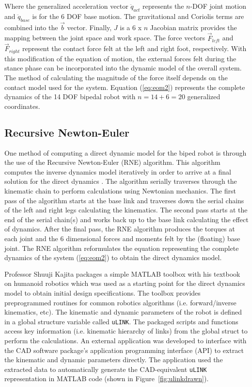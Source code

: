 Where the generalized acceleration vector $\ddot{q}_{act}$ represents the $n$-DOF joint motion and $\ddot{q}_{base}$ is for the 6 DOF base motion. The gravitational and Coriolis terms are combined into the $\vec{b}$ vector. Finally, $J$ is a 6 x $n$ Jacobian matrix provides the mapping between the joint space and work space. The force vectors $\vec{F}_{left}$ and $\vec{F}_{right}$ represent the contact force felt at the left and right foot, respectively. With this modification of the equation of motion, the external forces felt during the stance phase can be incorporated into the dynamic model of the overall system. The method of calculating the magnitude of the force itself depends on the contact model used for the system. Equation (\ref{eq:eom2}) represents the complete dynamics of the 14 DOF bipedal robot with $n = 14 + 6 = 20$ generalized coordinates.

\subsection{Recursive Newton-Euler} %
\label{sec:kajita_s_matlab_toolbox}

One method of computing a direct dynamic model for the biped robot is through the use of the Recursive Newton-Euler (RNE) algorithm. This algorithm computes the inverse dynamics model iteratively in order to arrive at a final solution for the direct dynamics \cite{Perrin:1997wn}. The algorithm serially traverses through the kinematic chain to perform calculations using Newtonian mechanics. The first pass of the algorithm starts at the base link and traverses down the serial chains of the left and right legs calculating the kinematics. The second pass starts at the end of the serial chain(s) and works back up to the base link calculating the effect of dynamics. After the final pass, the RNE algorithm produces the torques at each joint and the 6 dimensional forces and moments felt by the (floating) base joint. The RNE algorithm reformulates the equation representing the complete dynamics of the system (\ref{eq:eom2}) to obtain the direct dynamics model. 

Professor Shuuji Kajita packages a simple MATLAB \cite{sw:matlab} toolbox with his textbook on humanoid robotics \cite{kajitatxt} which was used as a starting point for the direct dynamics model to obtain initial design specifications. The toolbox provides preprogrammed routines for common robotics algorithms (i.e. forward/inverse kinematics, etc). The kinematic and dynamic parameters of the robot is defined in a global structure variable called \texttt{uLINK}. The packaged scripts and functions access key information (i.e. kinematic hierarchy of links) from the global struct to perform the calculations. An external application was developed to interface with the CAD software package's application programming interface (API) to extract the kinematic and dynamic parameters directly. The application used the extracted data to automatically generate the CAD-equivalent \texttt{uLINK} representation in MATLAB code (shown in Figure~\ref{fig:ulinkdrawn}).

